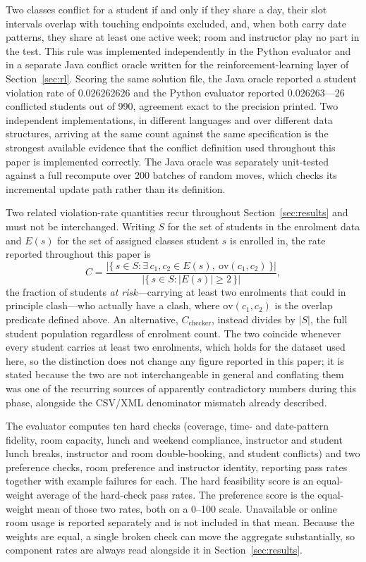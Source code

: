 \documentclass[journal]{IEEEtran}
\begin{document}
Two classes conflict for a student if and only if they share a day, their slot intervals overlap with touching endpoints excluded, and, when both carry date patterns, they share at least one active week; room and instructor play no part in the test. This rule was implemented independently in the Python evaluator and in a separate Java conflict oracle written for the reinforcement-learning layer of Section~\ref{sec:rl}. Scoring the same solution file, the Java oracle reported a student violation rate of $0.026262626$ and the Python evaluator reported $0.026263$---26 conflicted students out of 990, agreement exact to the precision printed. Two independent implementations, in different languages and over different data structures, arriving at the same count against the same specification is the strongest available evidence that the conflict definition used throughout this paper is implemented correctly. The Java oracle was separately unit-tested against a full recompute over 200 batches of random moves, which checks its incremental update path rather than its definition.

Two related violation-rate quantities recur throughout Section~\ref{sec:results} and must not be interchanged. Writing $S$ for the set of students in the enrolment data and $E(s)$ for the set of assigned classes student $s$ is enrolled in, the rate reported throughout this paper is
\begin{equation}
C = \frac{\lvert\{\,s\in S : \exists\, c_1,c_2\in E(s),\ \mathrm{ov}(c_1,c_2)\,\}\rvert}{\lvert\{\,s\in S : \lvert E(s)\rvert \ge 2\,\}\rvert},
\end{equation}
the fraction of students \emph{at risk}---carrying at least two enrolments that could in principle clash---who actually have a clash, where $\mathrm{ov}(c_1,c_2)$ is the overlap predicate defined above. An alternative, $C_{\text{checker}}$, instead divides by $\lvert S\rvert$, the full student population regardless of enrolment count. The two coincide whenever every student carries at least two enrolments, which holds for the dataset used here, so the distinction does not change any figure reported in this paper; it is stated because the two are not interchangeable in general and conflating them was one of the recurring sources of apparently contradictory numbers during this phase, alongside the CSV/XML denominator mismatch already described.

The evaluator computes ten hard checks (coverage, time- and date-pattern fidelity, room capacity, lunch and weekend compliance, instructor and student lunch breaks, instructor and room double-booking, and student conflicts) and two preference checks, room preference and instructor identity, reporting pass rates together with example failures for each. The hard feasibility score is an equal-weight average of the hard-check pass rates. The preference score is the equal-weight mean of those two rates, both on a 0--100 scale. Unavailable or online room usage is reported separately and is not included in that mean. Because the weights are equal, a single broken check can move the aggregate substantially, so component rates are always read alongside it in Section~\ref{sec:results}.
\end{document}
